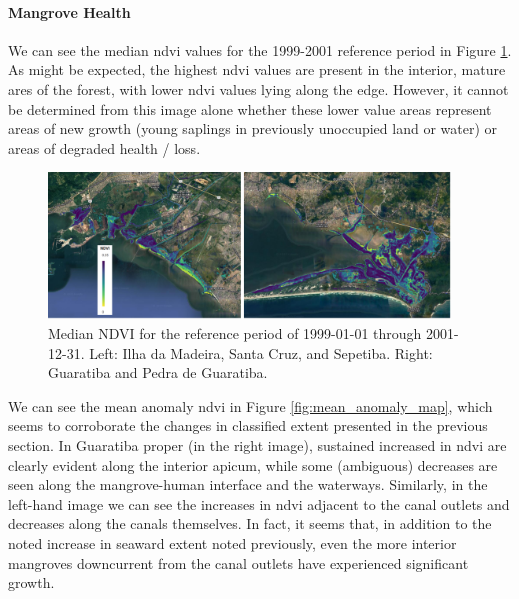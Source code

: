 \paragraph{Mangrove Health} \leavevmode\newline

We can see the median \ac{ndvi} values for the 1999-2001 reference period in Figure \ref{fig:reference_median}. As might be expected, the highest \ac{ndvi} values are present in the interior, mature ares of the forest, with lower \ac{ndvi} values lying along the edge. However, it cannot be determined from this image alone whether these lower value areas represent areas of new growth (young saplings in previously unoccupied land or water) or areas of degraded health / loss.  

\begin{figure}[!htb] 
\centering
\includegraphics[width=0.95\textwidth]{Figures/chap4/reference_median.png}
\caption[Reference Median NDVI of Region]{Median NDVI for the reference period of 1999-01-01 through 2001-12-31. Left: Ilha da Madeira, Santa Cruz, and Sepetiba. Right: Guaratiba and Pedra de Guaratiba.}
\label{fig:reference_median}
\end{figure}

We can see the mean anomaly \ac{ndvi} in Figure \ref{fig:mean_anomaly_map}, which seems to corroborate the changes in classified extent presented in the previous section. In Guaratiba proper (in the right image), sustained increased in \ac{ndvi} are clearly evident along the interior apicum, while some (ambiguous) decreases are seen along the mangrove-human interface and the waterways. Similarly, in the left-hand image we can see the increases in \ac{ndvi} adjacent to the canal outlets and decreases along the canals themselves. In fact, it seems that, in addition to the noted increase in seaward extent noted previously, even the more interior mangroves downcurrent from the canal outlets have experienced significant growth. 

